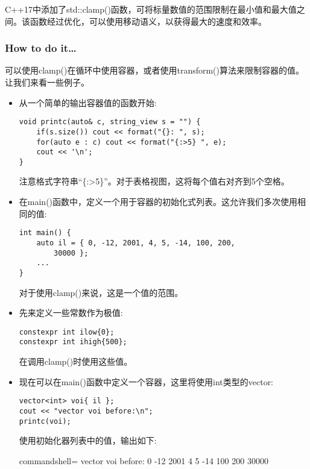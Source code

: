 
C++17中添加了std::clamp()函数，可将标量数值的范围限制在最小值和最大值之间。该函数经过优化，可以使用移动语义，以获得最大的速度和效率。

\subsubsection{How to do it…}

可以使用clamp()在循环中使用容器，或者使用transform()算法来限制容器的值。让我们来看一些例子。

\begin{itemize}
\item 
从一个简单的输出容器值的函数开始:

\begin{lstlisting}[style=styleCXX]
void printc(auto& c, string_view s = "") {
	if(s.size()) cout << format("{}: ", s);
	for(auto e : c) cout << format("{:>5} ", e);
	cout << '\n';
}
\end{lstlisting}

注意格式字符串“\{:>5\}”。对于表格视图，这将每个值右对齐到5个空格。

\item 
在main()函数中，定义一个用于容器的初始化式列表。这允许我们多次使用相同的值:

\begin{lstlisting}[style=styleCXX]
int main() {
	auto il = { 0, -12, 2001, 4, 5, -14, 100, 200,
		30000 };
	...
}
\end{lstlisting}

对于使用clamp()来说，这是一个值的范围。

\item 
先来定义一些常数作为极值:

\begin{lstlisting}[style=styleCXX]
constexpr int ilow{0};
constexpr int ihigh{500};
\end{lstlisting}

在调用clamp()时使用这些值。

\item 
现在可以在main()函数中定义一个容器，这里将使用int类型的vector:

\begin{lstlisting}[style=styleCXX]
vector<int> voi{ il };
cout << "vector voi before:\n";
printc(voi);
\end{lstlisting}

使用初始化器列表中的值，输出如下:

\begin{tcblisting}{commandshell={}}
vector voi before:
0 -12 2001 4 5 -14 100 200 30000
\end{tcblisting}


\end{itemize}
